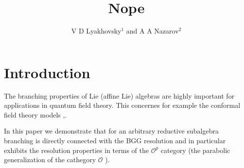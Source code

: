\documentclass[12pt]{article}
\theoremstyle{definition}
\begin{document}
\title{Nope}
\author{V D Lyakhovsky$^1$ and A A Nazarov$^2$}

\begin{abstract}
\end{abstract}

\section{Introduction}

\label{sec:introduction}

The branching properties of Lie (affine Lie) algebras are highly important for
applications in quantum field theory. This concernes for example the
conformal field theory models \cite{difrancesco1997cft},\cite
{coquereaux2008conformal}.


In this paper we demonstrate that for an arbitrary reductive subalgebra
branching is directly connected with the BGG resolution and in particular
exhibits the resolution properties in terms of the $\mathcal{O}^{p}$
category \cite{lepowsky1977generalization} (the parabolic generalization of the cathegory $%
\mathcal{O}$ \cite{bernstein1976category}).
\end{document}
